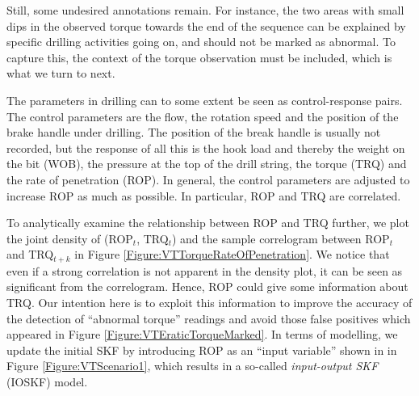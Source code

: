 Still, some undesired annotations remain. For instance, the two areas with small dips in the observed torque towards the end of the sequence can be explained by specific drilling activities going on, and should not be marked as abnormal. To capture this, the context of the torque observation must be included, which is what we turn to next.

The parameters in drilling can to some extent be seen as control-response pairs. The control parameters are the flow, the rotation speed and the position of the brake handle under drilling. The position of the break handle is usually not recorded, but the response of all this is the hook load and thereby the weight on the bit (WOB), the pressure at the top of the drill string, the torque (TRQ) and the rate of penetration (ROP). In general, the control parameters are adjusted to increase ROP as much as possible. In particular, ROP and TRQ are correlated.

To analytically examine the relationship between ROP and TRQ further, we plot the joint density of (ROP$_t$, TRQ$_t$) and the sample correlogram between ROP$_t$ and TRQ$_{t+k}$ in Figure \ref{Figure:VTTorqueRateOfPenetration}. We notice that even if a strong correlation is not apparent in the density plot, it can be seen as significant from the correlogram. Hence, ROP could give some information about TRQ. Our intention here is to exploit this information to improve the accuracy of the detection of ``abnormal torque'' readings and avoid those false positives which appeared in Figure \ref{Figure:VTEraticTorqueMarked}. In terms of modelling, we update the initial SKF by introducing ROP as an ``input variable'' shown in  in Figure \ref{Figure:VTScenario1}, which results in a so-called \textit{input-output SKF} (IOSKF) model. 

